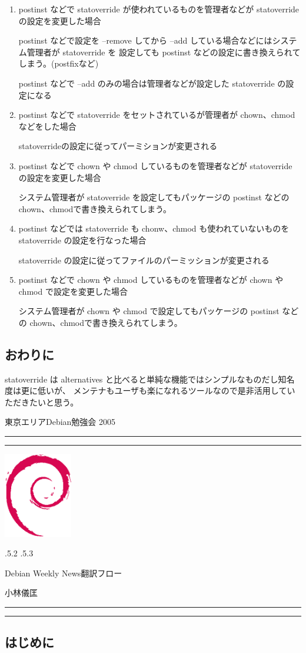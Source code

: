 \documentclass[mingoth,a4paper]{jsarticle}
\makeatletter
\renewcommand{\section}{\@startsection{section}{1}{\z@}%
    {\Cvs \@plus.5\Cdp \@minus.2\Cdp}%
    {.5\Cvs \@plus.3\Cdp}%
    {\normalfont\Large\headfont\raggedright\centering}} %
\newcommand{\dancersection}[2]{%
\newpage
東京エリアDebian勉強会 2005
\hrule
\vspace{0.5mm}
\hrule
\hfill{}\includegraphics[width=3cm]{image200502/openlogo-nd.eps}\\
\vspace{-4cm}
\begin{center}
  \section{#1}
\end{center}
\hfill{}#2\hspace{3cm}\space\\
\hrule
\hrule
\vspace{1cm}
}
\makeatother
\begin{document}
\begin{enumerate}
  \item postinst などで statoverride が使われているものを管理者などが statoverride の設定を変更した場合

    postinst などで設定を --remove してから --add している場合などにはシステム管理者が statoverride を
    設定しても postinst などの設定に書き換えられてしまう。(postfixなど)

    postinst などで --add のみの場合は管理者などが設定した statoverride の設定になる

  \item postinst などで statoverride をセットされているが管理者が chown、chmod などをした場合

    statoverrideの設定に従ってパーミションが変更される

  \item postinst などで chown や chmod しているものを管理者などが statoverride の設定を変更した場合

    システム管理者が statoverride を設定してもパッケージの postinst などの chown、chmodで書き換えられてしまう。

  \item postinst などでは statoverride も chonw、chmod も使われていないものを statoverride の設定を行なった場合

    statoverride の設定に従ってファイルのパーミッションが変更される

  \item postinst などで chown や chmod しているものを管理者などが chown や chmod で設定を変更した場合

    システム管理者が chown や chmod で設定してもパッケージの postinst などの chown、chmodで書き換えられてしまう。

\end{enumerate}

\subsection{おわりに}

  statoverride は alternatives と比べると単純な機能ではシンプルなものだし知名度は更に低いが、
  メンテナもユーザも楽になれるツールなので是非活用していただきたいと思う。


\dancersection{Debian Weekly News翻訳フロー}{小林儀匡}
\label{sec:kobayashi}

\subsection{はじめに}
\end{document}
